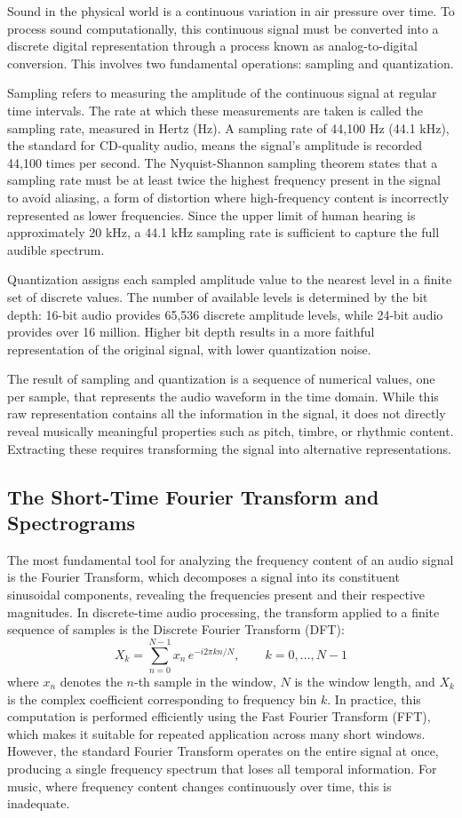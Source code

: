 Sound in the physical world is a continuous variation in air pressure over time. To process sound computationally, this continuous signal must be converted into a discrete digital representation through a process known as analog-to-digital conversion. This involves two fundamental operations: sampling and quantization.

Sampling refers to measuring the amplitude of the continuous signal at regular time intervals. The rate at which these measurements are taken is called the sampling rate, measured in Hertz (Hz). A sampling rate of 44,100 Hz (44.1 kHz), the standard for CD-quality audio, means the signal's amplitude is recorded 44,100 times per second. The Nyquist-Shannon sampling theorem states that a sampling rate must be at least twice the highest frequency present in the signal to avoid aliasing, a form of distortion where high-frequency content is incorrectly represented as lower frequencies. Since the upper limit of human hearing is approximately 20 kHz, a 44.1 kHz sampling rate is sufficient to capture the full audible spectrum.

Quantization assigns each sampled amplitude value to the nearest level in a finite set of discrete values. The number of available levels is determined by the bit depth: 16-bit audio provides 65,536 discrete amplitude levels, while 24-bit audio provides over 16 million. Higher bit depth results in a more faithful representation of the original signal, with lower quantization noise.

The result of sampling and quantization is a sequence of numerical values, one per sample, that represents the audio waveform in the time domain. While this raw representation contains all the information in the signal, it does not directly reveal musically meaningful properties such as pitch, timbre, or rhythmic content. Extracting these requires transforming the signal into alternative representations.

\subsection{The Short-Time Fourier Transform and Spectrograms}

The most fundamental tool for analyzing the frequency content of an audio signal is the Fourier Transform, which decomposes a signal into its constituent sinusoidal components, revealing the frequencies present and their respective magnitudes. In discrete-time audio processing, the transform applied to a finite sequence of samples is the Discrete Fourier Transform (DFT):
\[
X_k = \sum_{n=0}^{N-1} x_n\, e^{-i 2\pi k n / N}, \qquad k = 0, \ldots, N-1
\]
where \(x_n\) denotes the \(n\)-th sample in the window, \(N\) is the window length, and \(X_k\) is the complex coefficient corresponding to frequency bin \(k\). In practice, this computation is performed efficiently using the Fast Fourier Transform (FFT), which makes it suitable for repeated application across many short windows. However, the standard Fourier Transform operates on the entire signal at once, producing a single frequency spectrum that loses all temporal information. For music, where frequency content changes continuously over time, this is inadequate.

